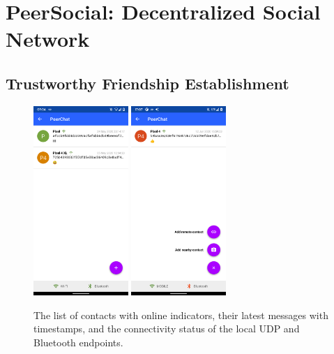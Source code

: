 \section{PeerSocial: Decentralized Social Network}

\subsection{Trustworthy Friendship Establishment}

\begin{figure}
    \centering
    \includegraphics[width=0.32\textwidth]{screens/superapp/contacts}
    \includegraphics[width=0.32\textwidth]{screens/superapp/contacts_menu}
    \caption{The list of contacts with online indicators, their latest messages with timestamps, and the connectivity status of the local UDP and Bluetooth endpoints.}
    \label{manyverse}
\end{figure}


